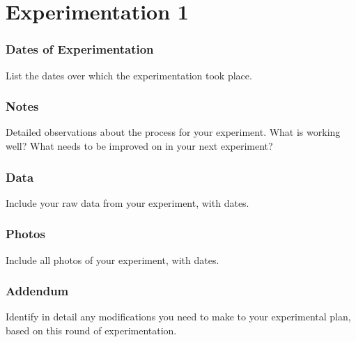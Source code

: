 \part{Experimentation 1}

\section*{Dates of Experimentation}
List the dates over which the experimentation took place.

\begin{field}

\end{field}

\section{Notes}

Detailed observations about the process for your experiment. What is working
well? What needs to be improved on in your next experiment?

\begin{field}

\end{field}

\section{Data}

Include your raw data from your experiment, with dates.

\section*{Photos}

Include all photos of your experiment, with dates.

\section{Addendum}

Identify in detail any modifications you need to make to your experimental plan,
based on this round of experimentation.

\begin{field}

\end{field}